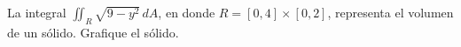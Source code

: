 \item La integral $\iint_R \sqrt{9 - y^2} \, dA$, en donde $R = [0, 4] \times [0, 2]$, representa el volumen de un sólido. Grafique el sólido.
